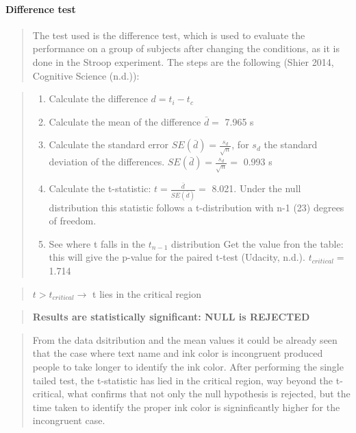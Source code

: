 \documentclass[]{article}
\providecommand{\tightlist}{%
  \setlength{\itemsep}{0pt}\setlength{\parskip}{0pt}}
\let\oldparagraph\paragraph
\renewcommand{\paragraph}[1]{\oldparagraph{#1}\mbox{}}
\begin{document}
\paragraph{\texorpdfstring{\textbf{Difference
test}}{Difference test}}\label{difference-test}

\begin{quote}
The test used is the difference test, which is used to evaluate the
performance on a group of subjects after changing the conditions, as it
is done in the Stroop experiment. The steps are the following (Shier
2014, Cognitive Science (n.d.)):
\end{quote}

\begin{quote}
\begin{enumerate}
\def\labelenumi{\arabic{enumi}.}
\tightlist
\item
  Calculate the difference \(d= t_i-t_c\)
\item
  Calculate the mean of the difference \(\bar{d}=\) 7.965 s
\item
  Calculate the standard error \(SE(\bar{d})= \frac{s_d}{\sqrt{n}}\),
  for \(s_d\) the standard deviation of the differences.
  \(SE(\bar{d})= \frac{s_d}{\sqrt{n}}=\) 0.993 s
\item
  Calculate the t-statistic: \(t=\frac{\bar{d}}{SE(\bar{d})}=\) 8.021.
  Under the null distribution this statistic follows a t-distribution
  with n-1 (23) degrees of freedom.
\item
  See where t falls in the \(t_{n-1}\) distribution Get the value fron
  the table: this will give the p-value for the paired t-test (Udacity,
  n.d.). \(t_{critical}=\) 1.714
\end{enumerate}
\end{quote}

\begin{quote}
\(t> t_{critical} \rightarrow\) t lies in the critical region
\end{quote}

\begin{quote}
\textbf{ Results are statistically significant: NULL is REJECTED }
\end{quote}

\begin{quote}
From the data dsitribution and the mean values it could be already seen
that the case where text name and ink color is incongruent produced
people to take longer to identify the ink color. After performing the
single tailed test, the t-statistic has lied in the critical region, way
beyond the t-critical, what confirms that not only the null hypothesis
is rejected, but the time taken to identify the proper ink color is
signinficantly higher for the incongruent case.
\end{quote}
\end{document}
